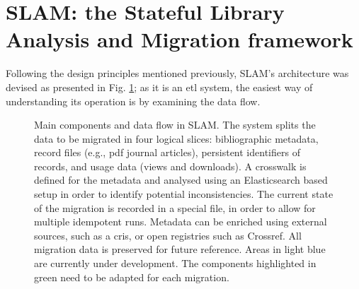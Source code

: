 \section{SLAM: the Stateful  Library  Analysis  and  Migration framework}
\label{sec:slam}

Following the design principles mentioned previously, SLAM's architecture was devised as presented in Fig. \ref{fig:workflow}; as it is an \gls{etl} system, the easiest way of understanding its operation is by examining the data flow.

\begin{figure}
  \centering
  \caption{Main components and data flow in SLAM. The system splits the data to be migrated in four logical slices: bibliographic metadata, record files (e.g., \gls{pdf} journal articles), persistent identifiers of records, and usage data (views and downloads). A crosswalk is defined for the metadata and analysed using an Elasticsearch based setup in order to identify potential inconsistencies. The current state of the migration is recorded in a special file, in order to allow for multiple idempotent runs. Metadata can be enriched using external sources, such as a \gls{cris}, or open registries such as Crossref. All migration data is preserved for future reference. Areas in light blue are currently under development. The components highlighted in green need to be adapted for each migration.}
  \label{fig:workflow}
\end{figure}
\afterpage{\clearpage}

